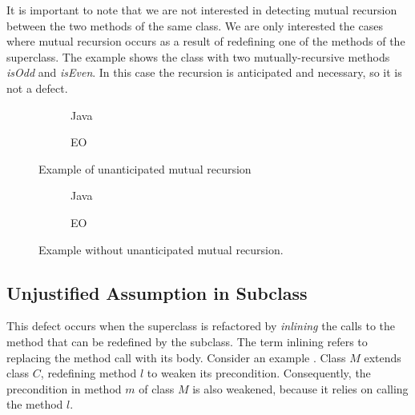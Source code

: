 It is important to note that we are not interested in detecting mutual recursion between the two methods of the same class. We are only interested the cases where mutual recursion occurs as a result of redefining one of the methods of the superclass. The example  shows the class with two mutually-recursive methods \textit{isOdd} and \textit{isEven}. In this case the recursion is anticipated and necessary, so it is not a defect.

\begin{figure}
    \centering
    \begin{subfigure}{0.4\textwidth}
        
        \caption{Java}
    \end{subfigure}
    \hfill
    \begin{subfigure}{0.4\textwidth}
        
        \caption{EO}
    \end{subfigure}
    \caption{Example of unanticipated mutual recursion}
    \label{fig:mutualrec_basic}
\end{figure}

\begin{figure}
    \centering
    \begin{subfigure}{0.4\textwidth}
        
        \caption{Java}
    \end{subfigure}
    \hfill
    \begin{subfigure}{0.4\textwidth}
        
        \caption{EO}
    \end{subfigure}
    \caption{Example without unanticipated mutual recursion.}
    \label{fig:oddeven}
\end{figure}

\subsection{Unjustified Assumption in Subclass}
This defect \cite[Section 3.3]{fragilebaseclass} occurs when the superclass is refactored by \textit{inlining} the calls to the method that can be redefined by the subclass. The term inlining refers to replacing the method call with its body. Consider an example . Class $M$ extends class $C$, redefining method $l$ to weaken its precondition. Consequently, the precondition in method $m$ of class $M$ is also weakened, because it relies on calling the method $l$.

